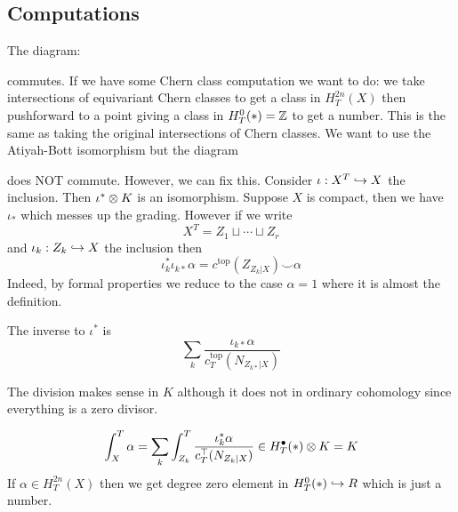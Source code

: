 \documentclass[12pt]{article}
\begin{document}
\subsection{Computations}

The diagram:
\begin{center}
\end{center}
commutes. If we have some Chern class computation we want to do: we take intersections of equivariant Chern classes to get a class in $H^{2n}_T(X)$ then pushforward to a point giving a class in $H^0_T(*) = \mathbb{Z}$ to get a number. This is the same as taking the original intersections of Chern classes. We want to use the Atiyah-Bott isomorphism but the diagram
\begin{center}
\end{center}
does NOT commute. However, we can fix this. Consider $\iota : X^T \hookrightarrow X$ the inclusion. Then $\iota^* \otimes K$ is an isomorphism. Suppose $X$ is compact, then we have $\iota_*$ which messes up the grading. However if we write
\[ X^T = Z_1 \sqcup \cdots \sqcup Z_r \]
and $\iota_k : Z_k \hookrightarrow X$ the inclusion then
\[ \iota_k^* \iota_{k*} \alpha = c^{\text{top}}(Z_{Z_k|X}) \smile \alpha \]
Indeed, by formal properties we reduce to the case $\alpha = 1$ where it is almost the definition. 

\begin{cor}
The inverse to $\iota^*$ is 
\[ \sum_k \frac{\iota_{k*} \alpha}{c^{\text{top}}_T(N_{Z_{k*}|X})} \]
\end{cor}

The division makes sense in $K$ although it does not in ordinary cohomology since everything is a zero divisor. 

\begin{cor}
\[ \int^T_X \alpha = \sum_k \int^T_{Z_k} \frac{\iota^*_k \alpha}{c^{\top}_T(N_{Z_k|X})} \in H_T^\bullet(*) \otimes K = K \]
If $\alpha \in H^{2n}_T(X)$ then we get degree zero element in $H^0_T(*) \hookrightarrow R$ which is just a number. 
\end{cor}
\end{document}
